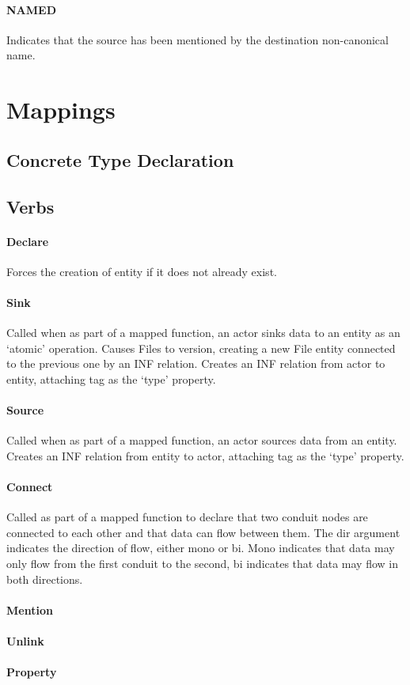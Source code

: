 \documentclass[12pt,twoside,openright,a4paper]{article}
\begin{document}
\paragraph{NAMED}
Indicates that the source has been mentioned by the destination non-canonical name.

\section{Mappings}

\subsection{Concrete Type Declaration}

\subsection{Verbs}

\paragraph{Declare}
Forces the creation of entity if it does not already exist.

\paragraph{Sink}
Called when as part of a mapped function, an actor sinks data to an entity as an ‘atomic’ operation.
Causes Files to version, creating a new File entity connected to the previous one by an INF relation.
Creates an INF relation from actor to entity, attaching tag as the ‘type’ property. 

\paragraph{Source}
Called when as part of a mapped function, an actor sources data from an entity.
Creates an INF relation from entity to actor, attaching tag as the ‘type’ property.

\paragraph{Connect}
Called as part of a mapped function to declare that two conduit nodes are connected to each other and that data can flow between them. The dir argument indicates the direction of flow, either mono or bi. Mono indicates that data may only flow from the first conduit to the second, bi indicates that data may flow in both directions. 

\paragraph{Mention}

\paragraph{Unlink}

\paragraph{Property}
\end{document}
